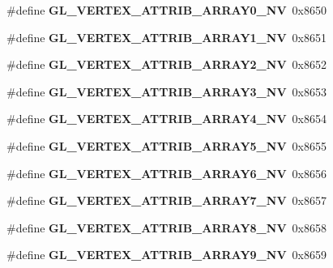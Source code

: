 \begin{DoxyCompactItemize}
\item 
\#define {\bfseries G\+L\+\_\+\+V\+E\+R\+T\+E\+X\+\_\+\+A\+T\+T\+R\+I\+B\+\_\+\+A\+R\+R\+A\+Y0\+\_\+\+N\+V}~0x8650\label{_s_d_l__opengl_8h_a7524fd78ca0e3d53ff8b216ade1e577c}

\item 
\#define {\bfseries G\+L\+\_\+\+V\+E\+R\+T\+E\+X\+\_\+\+A\+T\+T\+R\+I\+B\+\_\+\+A\+R\+R\+A\+Y1\+\_\+\+N\+V}~0x8651\label{_s_d_l__opengl_8h_ab30c0e413eeaf257a55a0d20896acebc}

\item 
\#define {\bfseries G\+L\+\_\+\+V\+E\+R\+T\+E\+X\+\_\+\+A\+T\+T\+R\+I\+B\+\_\+\+A\+R\+R\+A\+Y2\+\_\+\+N\+V}~0x8652\label{_s_d_l__opengl_8h_a91441e9ba61425a6badc3cded00aca7e}

\item 
\#define {\bfseries G\+L\+\_\+\+V\+E\+R\+T\+E\+X\+\_\+\+A\+T\+T\+R\+I\+B\+\_\+\+A\+R\+R\+A\+Y3\+\_\+\+N\+V}~0x8653\label{_s_d_l__opengl_8h_aff82802cc29b5dee4e80531e5ed02bd9}

\item 
\#define {\bfseries G\+L\+\_\+\+V\+E\+R\+T\+E\+X\+\_\+\+A\+T\+T\+R\+I\+B\+\_\+\+A\+R\+R\+A\+Y4\+\_\+\+N\+V}~0x8654\label{_s_d_l__opengl_8h_a97f6a6cf66a84d42218b11a843a9447e}

\item 
\#define {\bfseries G\+L\+\_\+\+V\+E\+R\+T\+E\+X\+\_\+\+A\+T\+T\+R\+I\+B\+\_\+\+A\+R\+R\+A\+Y5\+\_\+\+N\+V}~0x8655\label{_s_d_l__opengl_8h_a8739e37706cad368fd5784fbf7b72fcd}

\item 
\#define {\bfseries G\+L\+\_\+\+V\+E\+R\+T\+E\+X\+\_\+\+A\+T\+T\+R\+I\+B\+\_\+\+A\+R\+R\+A\+Y6\+\_\+\+N\+V}~0x8656\label{_s_d_l__opengl_8h_a1937170099696dd012902c338accb353}

\item 
\#define {\bfseries G\+L\+\_\+\+V\+E\+R\+T\+E\+X\+\_\+\+A\+T\+T\+R\+I\+B\+\_\+\+A\+R\+R\+A\+Y7\+\_\+\+N\+V}~0x8657\label{_s_d_l__opengl_8h_a91af9bf3adfa445374ca477ac9b17276}

\item 
\#define {\bfseries G\+L\+\_\+\+V\+E\+R\+T\+E\+X\+\_\+\+A\+T\+T\+R\+I\+B\+\_\+\+A\+R\+R\+A\+Y8\+\_\+\+N\+V}~0x8658\label{_s_d_l__opengl_8h_a5ef51a73c1491903cc90bdb02ff18fdd}

\item 
\#define {\bfseries G\+L\+\_\+\+V\+E\+R\+T\+E\+X\+\_\+\+A\+T\+T\+R\+I\+B\+\_\+\+A\+R\+R\+A\+Y9\+\_\+\+N\+V}~0x8659\label{_s_d_l__opengl_8h_a1e22f24af9b348d045d32866ceaddd00}


\end{DoxyCompactItemize}
